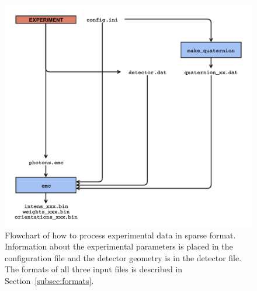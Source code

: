 \documentclass[]{iucr}              %
\begin{document}
\begin{figure}
\caption{Flowchart of how to process experimental data in sparse format. Information about the experimental parameters is placed in the configuration file and the detector geometry is in the detector file. The formats of all three input files is described in Section~\ref{subsec:formats}.}
\includegraphics[width=\textwidth]{figures/emc_exp.pdf}
\end{figure}
\end{document}
